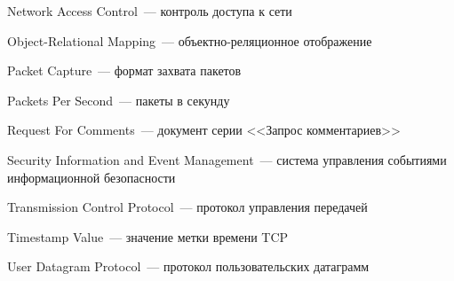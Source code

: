 \begin{description}[labelwidth=4cm, leftmargin=4.5cm, style=nextline]
  \item[NAC] Network Access Control~--- контроль доступа к сети
  \item[ORM] Object-Relational Mapping~--- объектно-реляционное отображение
  \item[PCAP] Packet Capture~--- формат захвата пакетов
  \item[PPS] Packets Per Second~--- пакеты в секунду
  \item[RFC] Request For Comments~--- документ серии <<Запрос комментариев>>
  \item[SIEM] Security Information and Event Management~--- система управления событиями информационной безопасности
  \item[TCP] Transmission Control Protocol~--- протокол управления передачей
  \item[TSval] Timestamp Value~--- значение метки времени TCP
  \item[UDP] User Datagram Protocol~--- протокол пользовательских датаграмм
\end{description}